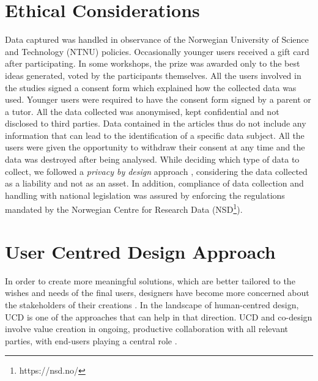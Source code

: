 \section{Ethical Considerations}

Data captured was handled in observance of the Norwegian University of Science and Technology (NTNU) policies. Occasionally younger users received a gift card after participating. In some workshops, the prize was awarded only to the best ideas generated, voted by the participants themselves. All the users involved in the studies signed a consent form which explained how the collected data was used. Younger users were required to have the consent form signed by a parent or a tutor. All the data collected was anonymised, kept confidential and not disclosed to third parties. Data contained in the articles thus do not include any information that can lead to the identification of a specific data subject. All the users were given the opportunity to withdraw their consent at any time and the data was destroyed after being analysed.
While deciding which type of data to collect, we followed a \textit{privacy by design} approach \autocite{cavoukian_privacy_2009}, considering the data collected as a liability and not as an asset. In addition, compliance of data collection and handling with national legislation was assured by enforcing the regulations mandated by the Norwegian Centre for Research Data (NSD\footnote{https://nsd.no/}).


\section{User Centred Design Approach}

In order to create more meaningful solutions, which are better tailored to the wishes and needs of the final users, designers have become more concerned about the stakeholders of their creations \autocite{sanders_co-creation_2008}. In the landscape of human-centred design, UCD is one of the approaches that can help in that direction.
UCD and co-design involve value creation in ongoing, productive collaboration with all relevant parties, with end-users playing a central role \autocite{jansen_7_2017}.

